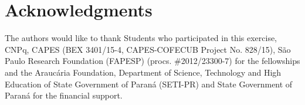 \section*{Acknowledgments}
\label{sec:acknowledgments}


The authors would like to thank Students who participated in this exercise, CNPq, CAPES (BEX 3401/15-4, CAPES-COFECUB Project No. 828/15), São Paulo Research Foundation (FAPESP) (procs. \#2012/23300-7) for the fellowships and the Araucária Foundation, Department of Science, Technology and High Education of State Government of Paraná (SETI-PR) and State Government of Paraná for the financial support.


